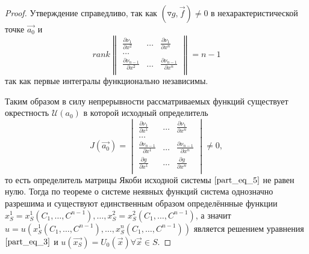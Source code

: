 \documentclass[a4paper, 12pt]{article}
\begin{document}
\begin{proof}
        Утверждение справедливо, так как $ \left( \triangledown g, \overrightarrow{f} \right) \neq 0$ в нехарактеристической точке $\overrightarrow{a_0}$ и
        \begin{equation*}
            rank
            \begin{Vmatrix}
                \frac{\partial \nu_1}{\partial x^2} & \dots & \frac{\partial \nu_1}{\partial x^n}            \\
                \dots                                                                                        \\
                \frac{\partial \nu_{n - 1}}{\partial x^2} & \dots & \frac{\partial \nu_{n - 1}}{\partial x^n}\\
            \end{Vmatrix} = n - 1
        \end{equation*}
        так как первые интегралы функционально независимы.

        Таким образом в силу непрерывности рассматриваемых функций существует окрестность $\mathcal{U} \left( a_0 \right)$ в которой исходный определитель
        \begin{equation*}
            J \left( \overrightarrow{a_0} \right) =
            \begin{vmatrix}
                \frac{\partial \nu_1}{\partial x^1} & \dots & \frac{\partial \nu_1}{\partial x^n}             \\
                \dots                                                                                         \\
                \frac{\partial \nu_{n - 1}}{\partial x^1} & \dots & \frac{\partial \nu_{n - 1}}{\partial x^n} \\
                \frac{\partial g}{\partial x^1} & \dots & \frac{\partial g}{\partial x^n}                     \\
            \end{vmatrix} \neq 0,
        \end{equation*}
        то есть определитель матрицы Якоби исходной системы $\eqref{part_eq_5}$ не равен нулю. Тогда по теореме о системе неявных функций система однозначно разрешима и существуют единственным образом определённные функции $x^1_S = x^1_S \left( C_1, \dots, C^{n - 1} \right), \dots, x^2_S = x^2_S \left( C_1, \dots, C^{n - 1} \right)$, а значит $u = u \left( x^1_S \left( C_1, \dots, C^{n - 1} \right), \dots, x^n_S \left( C_1, \dots, C^{n - 1} \right) \right)$ является решением уравнения $\eqref{part_eq_3}$ и $u \left( \overrightarrow{x_S} \right) = U_0 \left( \overrightarrow{x} \right) \forall \overrightarrow{x} \in S$.

    \end{proof}
\end{document}
